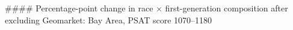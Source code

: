#### Percentage-point change in race × first-generation composition after excluding Geomarket: Bay Area, PSAT score 1070–1180

